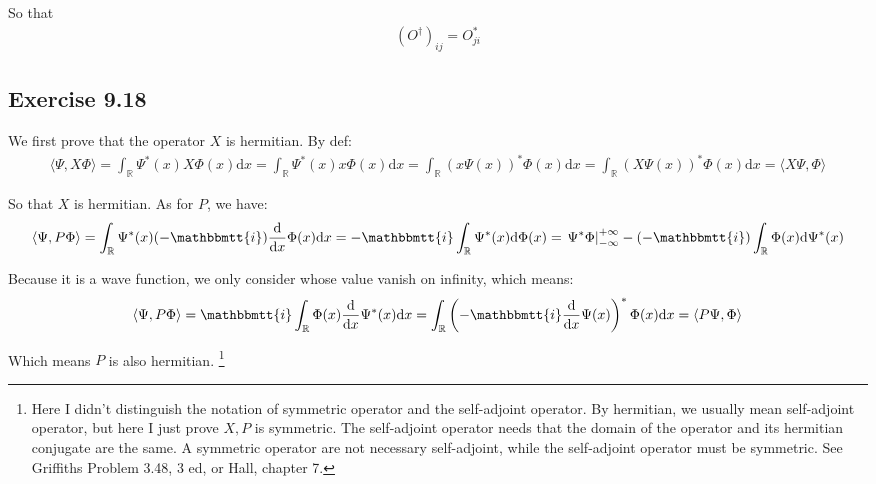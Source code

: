 \documentclass[]{ctexart}
\newcommand{\mi}{\mathbbmtt{i}}
\newcommand{\di}{\mathrm{d}}
\begin{document}
		So that 
			\begin{equation*}
			\begin{aligned}
				\left( O^{\dagger}\right)_{ij}=O^*_{ji}
			\end{aligned}
			\end{equation*}
	
	\subsection{Exercise 9.18}
		We first prove that the operator $X$ is hermitian. By def:
			\begin{equation*}
			\begin{aligned}
				\langle\Psi, X \Phi\rangle=\int_{\mathbb{R}}\Psi^*(x) X \Phi(x)\di x= \int_{\mathbb{R}}\Psi^*(x) x \Phi(x)\di x=\int_{\mathbb{R}}(x\Psi(x) )^* \Phi(x)\di x=\int_{\mathbb{R}}(X\Psi(x) )^* \Phi(x)\di x=\langle X \Psi, \Phi\rangle
			\end{aligned}
			\end{equation*}
			
		So that $X$ is hermitian. As for $P$, we have:
			\begin{equation*}
			\begin{aligned}
				\langle\Psi, P \Phi\rangle=\int_{\mathbb{R}}\Psi^*(x)(-\mi)\frac{\di }{\di x  } \Phi(x)\di x =-\mi\int_{\mathbb{R}}\Psi^*(x)\di \Phi (x)= \left.\Psi^*\Phi\right|_{-\infty}^{+\infty}-(-\mi)\int_{\mathbb{R}}\Phi(x)\di \Psi^* (x)
			\end{aligned}
			\end{equation*}
			
		Because it is a wave function, we only consider whose value vanish on infinity, which means:
			\begin{equation*}
			\begin{aligned}
				\langle\Psi, P \Phi\rangle=\mi \int_{\mathbb{R}}\Phi(x)\frac{\di }{\di x}\Psi^* (x)\di x=\int_{\mathbb{R}}\left(-\mi  \frac{\di }{\di x}\Psi (x)\right) ^*\Phi(x)\di x=\langle P \Psi , \Phi \rangle
			\end{aligned}
			\end{equation*}
			
		Which means $P$ is also hermitian. \footnote{Here I didn't distinguish the notation of symmetric operator and the self-adjoint operator. By hermitian, we usually mean self-adjoint operator, but here I just prove $X,P$ is symmetric. The self-adjoint operator needs that the domain of the operator and its hermitian conjugate are the same. A symmetric operator are not necessary self-adjoint, while the self-adjoint operator must be symmetric. See Griffiths Problem 3.48, 3 ed, or Hall, chapter 7. }
		
\end{document}
